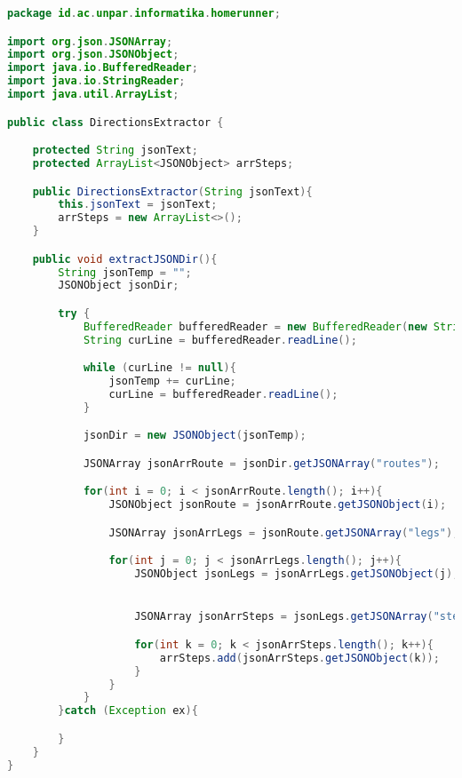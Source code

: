 \begin{lstlisting}[language=Java,caption=DirectionsExtractor.java]
package id.ac.unpar.informatika.homerunner;

import org.json.JSONArray;
import org.json.JSONObject;
import java.io.BufferedReader;
import java.io.StringReader;
import java.util.ArrayList;

public class DirectionsExtractor {

    protected String jsonText;
    protected ArrayList<JSONObject> arrSteps;

    public DirectionsExtractor(String jsonText){
        this.jsonText = jsonText;
        arrSteps = new ArrayList<>();
    }

    public void extractJSONDir(){
        String jsonTemp = "";
        JSONObject jsonDir;

        try {
            BufferedReader bufferedReader = new BufferedReader(new StringReader(jsonText));
            String curLine = bufferedReader.readLine();

            while (curLine != null){
                jsonTemp += curLine;
                curLine = bufferedReader.readLine();
            }

            jsonDir = new JSONObject(jsonTemp);

            JSONArray jsonArrRoute = jsonDir.getJSONArray("routes");

            for(int i = 0; i < jsonArrRoute.length(); i++){
                JSONObject jsonRoute = jsonArrRoute.getJSONObject(i);

                JSONArray jsonArrLegs = jsonRoute.getJSONArray("legs");

                for(int j = 0; j < jsonArrLegs.length(); j++){
                    JSONObject jsonLegs = jsonArrLegs.getJSONObject(j);


                    JSONArray jsonArrSteps = jsonLegs.getJSONArray("steps");

                    for(int k = 0; k < jsonArrSteps.length(); k++){
                        arrSteps.add(jsonArrSteps.getJSONObject(k));
                    }
                }
            }
        }catch (Exception ex){

        }
    }
}
\end{lstlisting}

